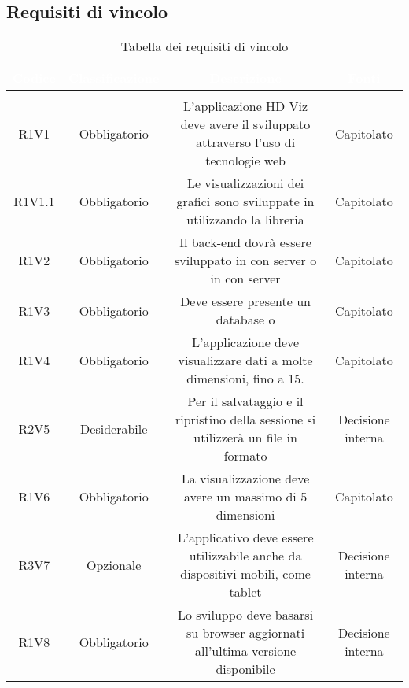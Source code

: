 \subsection{Requisiti di vincolo}
\renewcommand{\arraystretch}{1.5}
\begin{center}
\begin{longtable}{C{\colA} C{\colB} C{\colC} C{\colA}}
		\textcolor{white}{\textbf{Codice}} & 
		\textcolor{white}{\textbf{Classificazione}} & 
		\textcolor{white}{\textbf{Descrizione}} & 
		\textcolor{white}{\textbf{Fonti}} \\
		\endfirsthead
	    \\
	    \endfoot
	    \caption{Tabella dei requisiti di vincolo}
	    \endlastfoot

R1V1 & Obbligatorio & L'applicazione HD Viz deve avere il  sviluppato attraverso l'uso di tecnologie web & Capitolato \\
R1V1.1 & Obbligatorio & Le visualizzazioni dei grafici sono sviluppate in  utilizzando la libreria  & Capitolato\\
R1V2 & Obbligatorio & Il back-end dovrà essere sviluppato in  con server  o in  con server  & Capitolato \\
R1V3 & Obbligatorio & Deve essere presente un database  o  & Capitolato\\
R1V4 & Obbligatorio & L'applicazione deve visualizzare dati a molte dimensioni, fino a 15. & Capitolato\\
R2V5 & Desiderabile & Per il salvataggio e il ripristino della sessione si utilizzerà un file in formato  & Decisione interna\\
R1V6 & Obbligatorio & La visualizzazione  deve avere un massimo di 5 dimensioni & Capitolato\\
R3V7 & Opzionale & L'applicativo deve essere utilizzabile anche da dispositivi mobili, come tablet & Decisione interna\\
R1V8 & Obbligatorio & Lo sviluppo deve basarsi su browser aggiornati all'ultima versione disponibile & Decisione interna\\



\end{longtable}
\end{center}